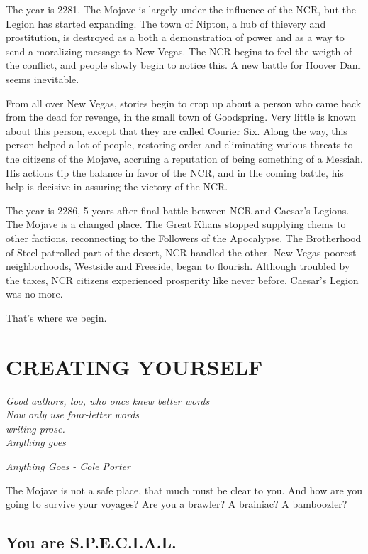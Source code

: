 \documentclass[11pt]{article} %
\begin{document}
The year is 2281. The Mojave is largely under the influence of the NCR, but the Legion has started expanding. The town of Nipton, a hub of thievery and prostitution, is destroyed as a both a demonstration of power and as a way to send a moralizing message to New Vegas. The NCR begins to feel the weigth of the conflict, and people slowly begin to notice this. A new battle for Hoover Dam seems inevitable. 

From all over New Vegas, stories begin to crop up about a person who came back from the dead for revenge, in the small town of Goodspring. Very little is known about this person, except that they are called Courier Six. Along the way, this person helped a lot of people, restoring order and eliminating various threats to the citizens of the Mojave, accruing a reputation of being something of a Messiah. His actions tip the balance in favor of the NCR, and in the coming battle, his help is decisive in assuring the victory of the NCR.

The year is 2286, 5 years after final battle between NCR and Caesar's Legions. The Mojave is a changed place. The Great Khans stopped supplying chems to other factions, reconnecting to the Followers of the Apocalypse. The Brotherhood of Steel patrolled part of the desert, NCR handled the other. New Vegas poorest neighborhoods, Westside and Freeside, began to flourish. Although troubled by the taxes, NCR citizens experienced prosperity like never before. Caesar's Legion was no more.

That's where we begin.

\newpage

\section{CREATING YOURSELF}

\epigraph{\textit{Good authors, too, who once knew better words \\
Now only use four-letter words \\
writing prose. \\
Anything goes}}{\textit{Anything Goes - Cole Porter}}

The Mojave is not a safe place, that much must be clear to you. And how are you going to survive your voyages? Are you a brawler? A brainiac? A bamboozler? 

\subsection{You are S.P.E.C.I.A.L.}
\end{document}

